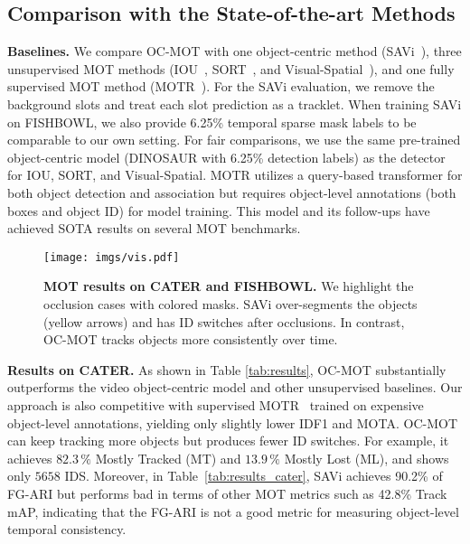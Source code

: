 \subsection{Comparison with the State-of-the-art Methods}
\noindent\textbf{Baselines.} We compare OC-MOT with one object-centric method (SAVi~\cite{kipf2022conditional}), three unsupervised MOT methods (IOU~\cite{bochinski2017high}, SORT~\cite{bewley2016simple}, and Visual-Spatial~\cite{bastani2021self}), and one fully supervised MOT method (MOTR~\cite{zeng2022motr}). For the SAVi evaluation, we remove the background slots and treat each slot prediction as a tracklet. When training SAVi on FISHBOWL, we also provide 6.25\% temporal sparse mask labels to be comparable to our own setting. For fair comparisons, we use the same pre-trained object-centric model (DINOSAUR with 6.25\% detection labels) as the detector for IOU, SORT, and Visual-Spatial.
MOTR utilizes a query-based transformer for both object detection and association but requires object-level annotations (both boxes and object ID) for model training. 
This model and its follow-ups have achieved SOTA results on several MOT benchmarks.

\begin{figure*}[!t]
	\centering
	\texttt{[image: imgs/vis.pdf]}
\caption{\textbf{MOT results on CATER and FISHBOWL.} We highlight the occlusion cases with colored masks. SAVi over-segments the objects (yellow arrows) and has ID switches after occlusions. In contrast, OC-MOT tracks objects more consistently over time.
 }
\label{fig:vis}
\end{figure*}

\vspace{+2.5mm}
\noindent\textbf{Results on CATER.}
As shown in Table \ref{tab:results}, OC-MOT substantially outperforms the video object-centric model and other unsupervised baselines. Our approach is also competitive with supervised MOTR~\cite{zeng2022motr} trained on expensive object-level annotations, yielding only slightly lower IDF1 and MOTA. OC-MOT can keep tracking more objects but produces fewer ID switches. For example, it achieves $82.3\,\%$ Mostly Tracked (MT) and $13.9\,\%$ Mostly Lost (ML), and shows only $5658$ IDS. Moreover, in Table~\ref{tab:results_cater}, SAVi achieves 90.2\% of FG-ARI but performs bad in terms of other MOT metrics such as 42.8\% Track mAP, indicating that the FG-ARI is not a good metric for measuring object-level temporal consistency.




